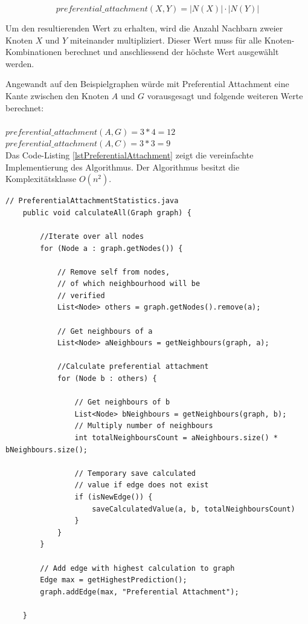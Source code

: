 \begin{equation}
    \label{eq:pa}
    preferential\_attachment(X,Y) = | N(X) | \cdot | N(Y ) |
\end{equation}

Um den resultierenden Wert zu erhalten, wird die Anzahl Nachbarn zweier Knoten $X$ und $Y$ miteinander multipliziert.
Dieser Wert muss für alle Knoten-Kombinationen berechnet und anschliessend der höchste Wert ausgewählt werden.

Angewandt auf den Beispielgraphen würde mit Preferential Attachment eine Kante zwischen den Knoten $A$ und $G$ vorausgesagt und folgende weiteren Werte berechnet:\\
\\
\vspace{4mm}
\forceindent $preferential\_attachment(A,G) = 3 * 4 = 12$\\
\vspace{4mm}
\forceindent $preferential\_attachment(A,C) = 3 * 3 = 9$\\

Das Code-Listing \ref{lstPreferentialAttachment} zeigt die vereinfachte Implementierung des Algorithmus. Der Algorithmus besitzt die Komplexitätsklasse $O(n^2)$.

\begin{lstlisting}[caption={Preferential attachment implementation},label=lstPreferentialAttachment]
    // PreferentialAttachmentStatistics.java
    public void calculateAll(Graph graph) {

        //Iterate over all nodes
        for (Node a : graph.getNodes()) {

            // Remove self from nodes,
            // of which neighbourhood will be
            // verified
            List<Node> others = graph.getNodes().remove(a);

            // Get neighbours of a
            List<Node> aNeighbours = getNeighbours(graph, a);

            //Calculate preferential attachment
            for (Node b : others) {

                // Get neighbours of b
                List<Node> bNeighbours = getNeighbours(graph, b);
                // Multiply number of neighbours
                int totalNeighboursCount = aNeighbours.size() * bNeighbours.size();

                // Temporary save calculated
                // value if edge does not exist
                if (isNewEdge()) {
                    saveCalculatedValue(a, b, totalNeighboursCount)
                }
            }
        }

        // Add edge with highest calculation to graph
        Edge max = getHighestPrediction();
        graph.addEdge(max, "Preferential Attachment");

    }
\end{lstlisting}

